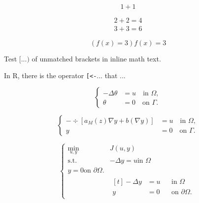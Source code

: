 \documentclass{article}
\begin{document}
\[
  1+1
      \]

\begin{align}
    2+2 = 4\\[1ex]
        3+3 = 6
    \end{align}

\begin{equation}
   \left(
     f(x) = 3
  \right)
  \left.
      f(x) = 3
\right.
\end{equation}

Test $[ ... )$ of unmatched brackets in
inline math text.

In R, there is the operator \verb|[<-|...
that ...

\begin{equation*} 
  \left \{ 
    \begin{aligned}
      -\Delta \theta &= u \quad \text{in } \Omega, \\
      \theta &=0 \quad \text{on } \Gamma.
    \end{aligned}
  \right.
\end{equation*}

\begin{equation} \label{eq:state2}
  \left\{
    \begin{aligned}
      -\div [a_M(z)\nabla y + b(\nabla y)]  &= u \quad \text{in } \Omega, \\
      y &=0 \quad \text{on } \Gamma.
    \end{aligned}
  \right.
\end{equation}

\begin{equation}
    \left\{
        \begin{aligned}
            \min_{u,y} &J(u,y) \\
            \text{s.t.} \quad
            &
                -\Delta y = u \text{in } \Omega\\
                y = 0 \text{on } \partial\Omega.
             \\
            &\begin{aligned}[t]
                -\Delta y &= u && \text{in } \Omega\\
                y &= 0 && \text{on } \partial\Omega.
            \end{aligned}
        \end{aligned}
    \right.
  \end{equation}
\end{document}

